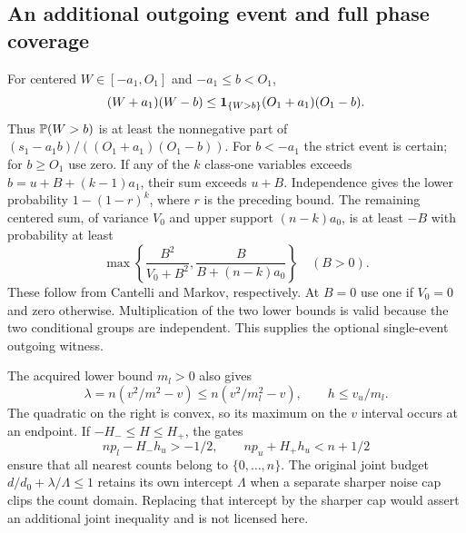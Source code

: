 \subsection{An additional outgoing event and full phase coverage}
For centered $W\in[-a_1,O_1]$ and $-a_1\le b<O_1$,
\[
 (W+a_1)(W-b)\le\mathbf 1_{\{W>b\}}(O_1+a_1)(O_1-b).
\]
Thus $\mathbb P(W>b)$ is at least the nonnegative part of
$(s_1-a_1b)/((O_1+a_1)(O_1-b))$.
For $b<-a_1$ the strict event is certain; for $b\ge O_1$ use zero.
If any of the $k$ class-one variables exceeds
$b=u+B+(k-1)a_1$, their sum exceeds $u+B$.
Independence gives the lower probability $1-(1-r)^k$, where $r$
is the preceding bound. The remaining centered sum, of variance $V_0$
and upper support $(n-k)a_0$, is at least $-B$ with probability at
least
\[
 \max\left\{\frac{B^2}{V_0+B^2},
                         \frac{B}{B+(n-k)a_0}\right\}\quad(B>0).
\]
These follow from Cantelli and Markov, respectively. At $B=0$ use
one if $V_0=0$ and zero otherwise. Multiplication of the two lower
bounds is valid because the two conditional groups are independent.
This supplies the optional single-event outgoing witness.

The acquired lower bound $m_l>0$ also gives
\[
 \lambda=n(v^2/m^2-v)\le n(v^2/m_l^2-v),\qquad h\le v_u/m_l.
\]
The quadratic on the right is convex, so its maximum on the $v$
interval occurs at an endpoint. If $-H_-\le H\le H_+$, the gates
\[
 np_l-H_-h_u>-1/2,\qquad np_u+H_+h_u<n+1/2
\]
ensure that all nearest counts belong to $\{0,\ldots,n\}$.
The original joint budget $d/d_0+\lambda/\Lambda\le1$ retains
its own intercept $\Lambda$ when a separate sharper noise cap clips
the count domain. Replacing that intercept by the sharper cap would
assert an additional joint inequality and is not licensed here.
